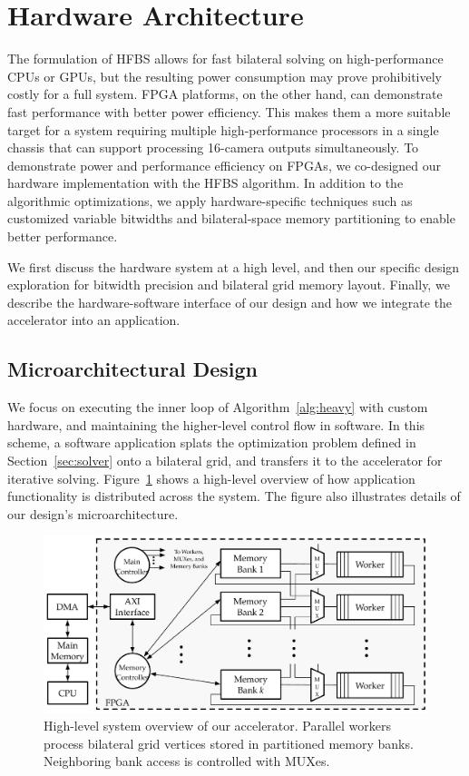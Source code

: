 \section{Hardware Architecture}

The formulation of HFBS allows for fast bilateral solving on high\hyp{}performance CPUs or GPUs, but the resulting power consumption may prove prohibitively costly for a full system.
FPGA platforms, on the other hand, can demonstrate fast performance with better power efficiency.
This makes them a more suitable target for a system requiring multiple high\hyp{}performance processors in a single chassis that can support processing 16-camera outputs simultaneously.
To demonstrate power and performance efficiency on FPGAs, we co-designed our hardware implementation with the HFBS algorithm.
In addition to the algorithmic optimizations, we apply hardware-specific techniques such as customized variable bitwidths and bilateral-space memory partitioning to enable better performance.

We first discuss the hardware system at a high level, and then our specific design exploration for bitwidth precision and bilateral grid memory layout.
Finally, we describe the hardware-software interface of our design and how we integrate the accelerator into an application.


\subsection{Microarchitectural Design}

We focus on executing the inner loop of Algorithm~\ref{alg:heavy} with custom hardware, and maintaining the higher-level control flow in software.
In this scheme, a software application splats the optimization problem defined in Section~\ref{sec:solver} onto a bilateral grid, and transfers it to the accelerator for iterative solving.
Figure~\ref{fig:sys-overview} shows a high-level overview of how application functionality is distributed across the system.
The figure also illustrates details of our design's microarchitecture.

\begin{figure}[h]
\centering
\includegraphics[width=\textwidth]{hfbs-figs/system_architecture.pdf}

\caption{High-level system overview of our accelerator. Parallel workers process bilateral grid vertices stored in partitioned memory banks.
Neighboring bank access is controlled with MUXes.
}
\label{fig:sys-overview}

\end{figure}


